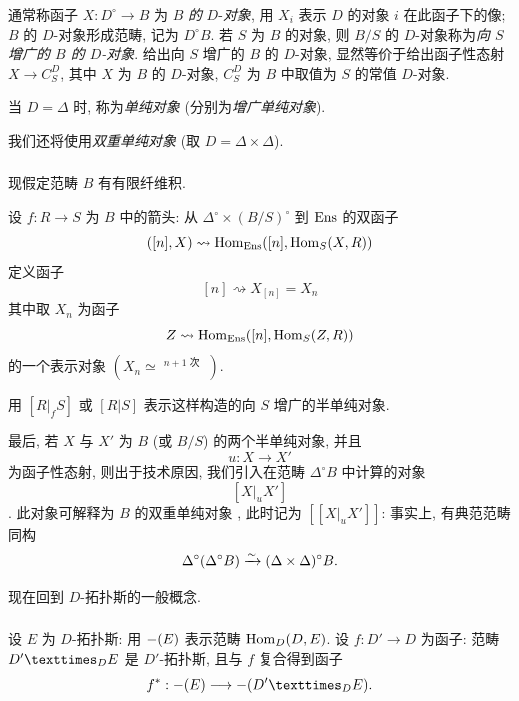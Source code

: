 \subsubsection{}
通常称函子 $X : D^{\circ} \to B$ 为 $B$ \emph{的} $D$-\emph{对象},
用 $X_i$ 表示 $D$ 的对象 $i$ 在此函子下的像;
$B$ 的 $D$-对象形成范畴, 记为 $D^{\circ}B$.
若 $S$ 为 $B$ 的对象, 则 $B/S$ 的 $D$-对象称为\emph{向 $S$ 增广的 $B$ 的 $D$-对象}.
给出向 $S$ 增广的 $B$ 的 $D$-对象, 显然等价于给出函子性态射 $X \to C^{D}_S$,
其中 $X$ 为 $B$ 的 $D$-对象, $C^D_S$ 为 $B$ 中取值为 $S$ 的常值 $D$-对象.

当 $D = \Delta$ 时, 称为\emph{单纯对象} (分别为\emph{增广单纯对象}).

我们还将使用\emph{双重单纯对象} (取 $D = \Delta \times \Delta$).

\subsubsection{}
现假定\pageoriginale{}范畴 $B$ 有有限纤维积.

设 $f : R \to S$ 为 $B$ 中的箭头: 从 $\Delta^{\circ} \times (B / S)^{\circ}$ 到 $\operatorname{Ens}$ 的双函子
$$
([n], X) \rightsquigarrow \operatorname{Hom}_{\operatorname{Ens}} ([n], \operatorname{Hom}_S (X, R))
$$
定义函子
$$
[n] \rightsquigarrow X_{[n]} = X_n
$$
其中取 $X_n$ 为函子
$$
Z \rightsquigarrow \operatorname{Hom}_{\operatorname{Ens}} ([n], \operatorname{Hom}_S (Z, R))
$$
的一个表示对象
$(X_n \simeq \displaystyle\mathop{\overbrace{R \times_S R
    \times \ldots \times_S R}}^{n+1 \text{ 次 }})$.

用 $[R |_{f} S]$ 或 $[R | S]$ 表示这样构造的向 $S$ 增广的半单纯对象.

最后, 若 $X$ 与 $X'$ 为 $B$ (或 $B/S$) 的两个半单纯对象,
并且 $$u : X \to X'$$ 为函子性态射,
则出于技术原因, 我们引入在范畴 $\Delta^{\circ}B$ 中计算的对象 $$[X |_{u} X']$$.
此对象可解释为 $B$ 的双重单纯对象
, 此时记为 $[[X |_u X']]$:
事实上, 有典范范畴同构
$$
\Delta^{\circ} (\Delta^{\circ} B) \xrightarrow{\sim} (\Delta
\times \Delta)^{\circ} B{}.
$$

现在回到 $D$-拓扑斯的一般概念.

\subsubsection{}
设 $E$ 为 $D$-拓扑斯: 用 $\Ysheaf{\Gamma}(E)$ 表示范畴 $\operatorname{Hom}_D (D, E)$.
设 $f : D'\to D$ 为函子: 范畴 $\fprod{D'}{E}{D}$ 是 $D'$-拓扑斯,
且与 $f$ 复合得到函子
$$
f^{\ast} : \Ysheaf{\Gamma} (E) \longrightarrow \Ysheaf{\Gamma} (\fprod{D'}{E}{D}){\quoi}.
$$

